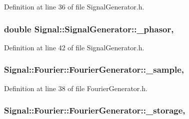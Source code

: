 Definition at line 36 of file Signal\+Generator.\+h.

\hypertarget{classSignal_1_1SignalGenerator_af4aa0728ded00777be26a06d883eaeb3}{
\subsubsection[{\+\_\+phasor}]{\setlength{\rightskip}{0pt plus 5cm}double Signal\+::\+Signal\+Generator\+::\+\_\+phasor\hspace{0.3cm}{\ttfamily [protected]}, {\ttfamily [inherited]}}}\label{classSignal_1_1SignalGenerator_af4aa0728ded00777be26a06d883eaeb3}


Definition at line 42 of file Signal\+Generator.\+h.

\hypertarget{classSignal_1_1Fourier_1_1FourierGenerator_ad720bf2b268dc621ace64c54c0816597}{
\subsubsection[{\+\_\+sample}]{ Signal\+::\+Fourier\+::\+Fourier\+Generator\+::\+\_\+sample\hspace{0.3cm}{\ttfamily [protected]}, {\ttfamily [inherited]}}}\label{classSignal_1_1Fourier_1_1FourierGenerator_ad720bf2b268dc621ace64c54c0816597}


Definition at line 38 of file Fourier\+Generator.\+h.

\hypertarget{classSignal_1_1Fourier_1_1FourierGenerator_ab6e6b79cf56e31c9a1b5766f357f8cfb}{
\subsubsection[{\+\_\+storage}]{ Signal\+::\+Fourier\+::\+Fourier\+Generator\+::\+\_\+storage\hspace{0.3cm}{\ttfamily [protected]}, {\ttfamily [inherited]}}}\label{classSignal_1_1Fourier_1_1FourierGenerator_ab6e6b79cf56e31c9a1b5766f357f8cfb}


